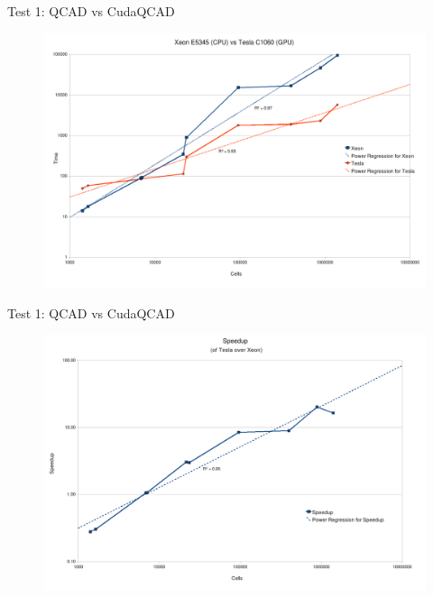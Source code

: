\documentclass[10pt, red]{beamer}
\begin{document}
	\begin{frame}{Test 1: QCAD vs CudaQCAD}
	 	\begin{figure}
			\centering
			\includegraphics[width=\textwidth]{img/xeonvstesla}
	 	\end{figure} 
	\end{frame}

	\begin{frame}{Test 1: QCAD vs CudaQCAD}
	 	\begin{figure}
			\centering
			\includegraphics[width=\textwidth]{img/speedup}
	 	\end{figure} 
	\end{frame}
\end{document}

